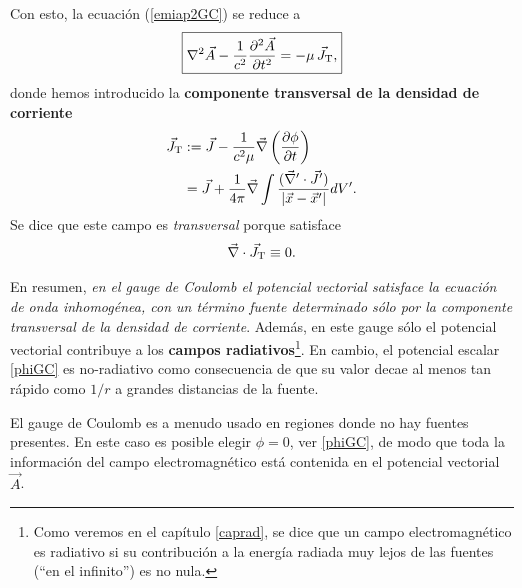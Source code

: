 Con esto, la ecuación (\ref{emiap2GC}) se reduce a
\begin{equation}\label{emiap3GC}
\boxed{\nabla^2\vec{A}-\frac{1}{c^2}\frac{\partial^2\vec{A}}{\partial t^2}=-\mu\,\vec{J}_{\rm T},}
\end{equation}
donde hemos introducido la \textbf{componente transversal de la densidad de corriente}
\begin{align}
\vec{J}_{\rm T} &:= \vec{J}-\frac{1}{c^2\mu}\vec{\nabla}\left(\frac{\partial\phi }{\partial t}\right) \\
&= \vec{J}+\frac{1}{4\pi} \vec{\nabla}\int\frac{(\vec{\nabla}'\cdot\vec{J}')}{\left|\vec{x}-\vec{x}'\right|}dV'.
\end{align}
Se dice que este campo es \textit{transversal} porque satisface
\begin{equation}
\vec\nabla\cdot\vec{J}_{\rm T}\equiv 0.
\end{equation}

En resumen, \textit{en el gauge de Coulomb el potencial vectorial satisface la  \textit{ecuación de onda inhomogénea}, con un término fuente determinado sólo por la componente transversal de la densidad de corriente}. Además, en este gauge  sólo el potencial vectorial contribuye a los \textbf{campos radiativos}\footnote{Como veremos en el capítulo \ref{caprad}, se dice que un campo electromagnético es radiativo si su contribución a la energía radiada muy lejos de las fuentes (``en el infinito'') es no nula.}. En cambio, el potencial escalar \eqref{phiGC} es no-radiativo como consecuencia de que su valor decae al menos tan rápido como $1/r$ a grandes distancias de la fuente.

El gauge de Coulomb es a menudo usado en regiones donde no hay fuentes presentes. En este caso es posible elegir $\phi=0$, ver \eqref{phiGC}, de modo que toda la información del campo electromagnético está contenida en el potencial vectorial $\vec{A}$.


